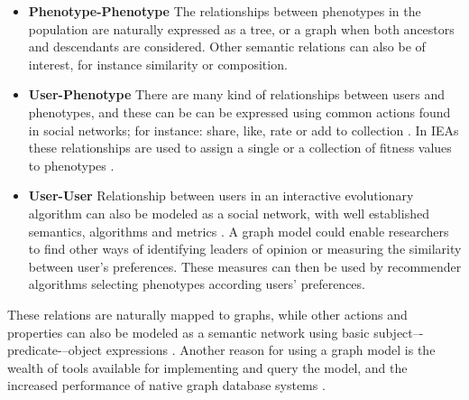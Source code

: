 \documentclass[conference]{IEEEtran}
\begin{document}
\begin{itemize}

  \item {\bf Phenotype-Phenotype} The relationships between phenotypes in the
  population %
are naturally expressed as a tree, or a graph when both ancestors 
  and descendants are considered. Other semantic relations can also be
  of interest, 
  for instance similarity or composition. %


  \item {\bf User-Phenotype} There are many kind of relationships
    between users and phenotypes, and these can be
  can be expressed using common actions found in social networks;
  for instance: share, like, rate or add to collection \cite{Prodromou:16:AS}. In IEAs these
  relationships are used to assign a single or a collection of
  fitness values to phenotypes \cite{garcia2013evospace}.   %

  \item {\bf User-User}
  Relationship between users in an interactive evolutionary algorithm can also be modeled 
  as a social network, with well established semantics, algorithms and metrics \cite{ahuja1993network}.
  A graph model could enable researchers to find other ways of identifying leaders of 
  opinion or measuring the similarity between user's preferences. 
  These measures can then be used by recommender algorithms selecting 
  phenotypes according users' preferences. 

\end{itemize}

These relations are naturally mapped to graphs, %
while other actions and 
properties can also be modeled as a semantic network using
basic subject–-predicate-–object expressions
\cite{Prud'hommeaux:14:RT}. %
Another reason for using a graph model %
is the wealth of tools available for
implementing and query the model, and the increased performance of
native graph database systems \cite{holzschuher2013performance,holzschuher2016querying}.
 
\end{document}
